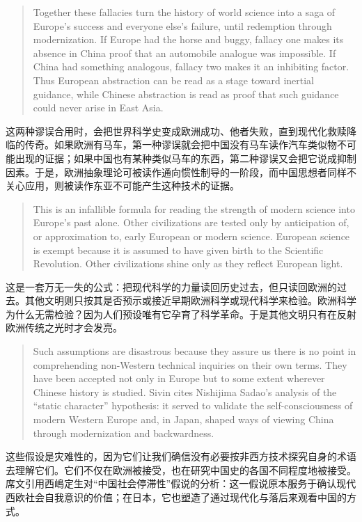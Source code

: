 \documentclass[UTF8,zihao=-4]{ctexart}
\newenvironment{enblock}
  {\par\smallskip\noindent{\scriptsize\bfseries English}\par\begin{quote}\small}
  {\end{quote}}
\newenvironment{zhblock}
  {\par\noindent{\scriptsize\bfseries 中文}\par}
  {\par\medskip}
\begin{document}
\begin{enblock}
Together these fallacies turn the history of world science into a saga of Europe's success and everyone else's failure, until redemption through modernization. If Europe had the horse and buggy, fallacy one makes its absence in China proof that an automobile analogue was impossible. If China had something analogous, fallacy two makes it an inhibiting factor. Thus European abstraction can be read as a stage toward inertial guidance, while Chinese abstraction is read as proof that such guidance could never arise in East Asia.
\end{enblock}
\begin{zhblock}
这两种谬误合用时，会把世界科学史变成欧洲成功、他者失败，直到现代化救赎降临的传奇。如果欧洲有马车，第一种谬误就会把中国没有马车读作汽车类似物不可能出现的证据；如果中国也有某种类似马车的东西，第二种谬误又会把它说成抑制因素。于是，欧洲抽象理论可被读作通向惯性制导的一阶段，而中国思想者同样不关心应用，则被读作东亚不可能产生这种技术的证据。
\end{zhblock}

\begin{enblock}
This is an infallible formula for reading the strength of modern science into Europe's past alone. Other civilizations are tested only by anticipation of, or approximation to, early European or modern science. European science is exempt because it is assumed to have given birth to the Scientific Revolution. Other civilizations shine only as they reflect European light.
\end{enblock}
\begin{zhblock}
这是一套万无一失的公式：把现代科学的力量读回历史过去，但只读回欧洲的过去。其他文明则只按其是否预示或接近早期欧洲科学或现代科学来检验。欧洲科学为什么无需检验？因为人们预设唯有它孕育了科学革命。于是其他文明只有在反射欧洲传统之光时才会发亮。
\end{zhblock}

\begin{enblock}
Such assumptions are disastrous because they assure us there is no point in comprehending non-Western technical inquiries on their own terms. They have been accepted not only in Europe but to some extent wherever Chinese history is studied. Sivin cites Nishijima Sadao's analysis of the ``static character'' hypothesis: it served to validate the self-consciousness of modern Western Europe and, in Japan, shaped ways of viewing China through modernization and backwardness.
\end{enblock}
\begin{zhblock}
这些假设是灾难性的，因为它们让我们确信没有必要按非西方技术探究自身的术语去理解它们。它们不仅在欧洲被接受，也在研究中国史的各国不同程度地被接受。席文引用西嶋定生对“中国社会停滞性”假说的分析：这一假说原本服务于确认现代西欧社会自我意识的价值；在日本，它也塑造了通过现代化与落后来观看中国的方式。
\end{zhblock}
\end{document}
